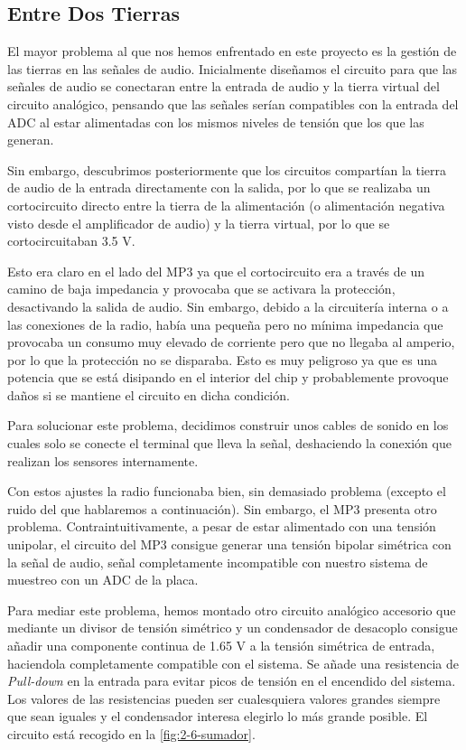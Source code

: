 \subsection{Entre Dos Tierras}
\label{subsec:entre-dos-tierras}

El mayor problema al que nos hemos enfrentado en este proyecto es la gestión de las tierras en las señales de audio. Inicialmente diseñamos el circuito para que las señales de audio se conectaran entre la entrada de audio y la tierra virtual del circuito analógico, pensando que las señales serían compatibles con la entrada del ADC al estar alimentadas con los mismos niveles de tensión que los que las generan.

Sin embargo, descubrimos posteriormente que los circuitos compartían la tierra de audio de la entrada directamente con la salida, por lo que se realizaba un cortocircuito directo entre la tierra de la alimentación (o alimentación negativa visto desde el amplificador de audio) y la tierra virtual, por lo que se cortocircuitaban 3.5 V. 

Esto era claro en el lado del MP3 ya que el cortocircuito era a través de un camino de baja impedancia y provocaba que se activara la protección, desactivando la salida de audio. Sin embargo, debido a la circuitería interna o a las conexiones de la radio, había una pequeña pero no mínima impedancia que provocaba un consumo muy elevado de corriente pero que no llegaba al amperio, por lo que la protección no se disparaba. Esto es muy peligroso ya que es una potencia que se está disipando en el interior del chip y probablemente provoque daños si se mantiene el circuito en dicha condición.

Para solucionar este problema, decidimos construir unos cables de sonido en los cuales solo se conecte el terminal que lleva la señal, deshaciendo la conexión que realizan los sensores internamente.

Con estos ajustes la radio funcionaba bien, sin demasiado problema (excepto el ruido del que hablaremos a continuación). Sin embargo, el MP3 presenta otro problema. Contraintuitivamente, a pesar de estar alimentado con una tensión unipolar, el circuito del MP3 consigue generar una tensión bipolar simétrica con la señal de audio, señal completamente incompatible con nuestro sistema de muestreo con un ADC de la placa.

Para mediar este problema, hemos montado otro circuito analógico accesorio que mediante un divisor de tensión simétrico y un condensador de desacoplo consigue añadir una componente continua de 1.65 V a la tensión simétrica de entrada, haciendola completamente compatible con el sistema. Se añade una resistencia de \textit{Pull-down} en la entrada para evitar picos de tensión en el encendido del sistema. Los valores de las resistencias pueden ser cualesquiera valores grandes siempre que sean iguales y el condensador interesa elegirlo lo más grande posible. El circuito está recogido en la \autoref{fig:2-6-sumador}. 


